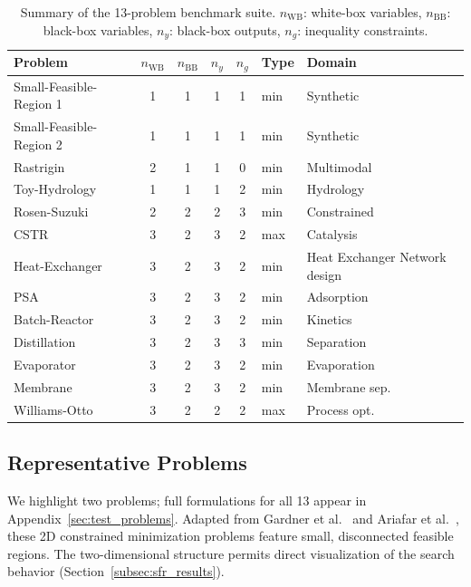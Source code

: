 \documentclass[12pt,a4paper]{article}%
\theoremstyle{plain}%
\theoremstyle{remark}%
\theoremstyle{definition}%
\def\WB{\mathrm{WB}}
\def\BB{\mathrm{BB}}
\begin{document}
\begin{table}[htbp]
\centering
\caption{Summary of the 13-problem benchmark suite. $n_{\WB}$: white-box variables, $n_{\BB}$: black-box variables, $n_y$: black-box outputs, $n_g$: inequality constraints.}
\label{tab:benchmark_summary}
\begin{tabular}{@{}lccccll@{}}
\toprule
\textbf{Problem} & $n_{\WB}$ & $n_{\BB}$ & $n_y$ & $n_g$ & \textbf{Type} & \textbf{Domain} \\
\midrule
Small-Feasible-Region 1 & 1 & 1 & 1 & 1 & min & Synthetic \\
Small-Feasible-Region 2 & 1 & 1 & 1 & 1 & min & Synthetic \\
Rastrigin & 2 & 1 & 1 & 0 & min & Multimodal \\
Toy-Hydrology & 1 & 1 & 1 & 2 & min & Hydrology \\
Rosen-Suzuki & 2 & 2 & 2 & 3 & min & Constrained \\
\midrule
CSTR & 3 & 2 & 3 & 2 & max & Catalysis \\
Heat-Exchanger & 3 & 2 & 3 & 2 & min & Heat Exchanger Network design \\
PSA & 3 & 2 & 3 & 2 & min & Adsorption \\
Batch-Reactor & 3 & 2 & 3 & 2 & min & Kinetics \\
Distillation & 3 & 2 & 3 & 3 & min & Separation \\
Evaporator & 3 & 2 & 3 & 2 & min & Evaporation \\
Membrane & 3 & 2 & 3 & 2 & min & Membrane sep.\ \\
Williams-Otto & 3 & 2 & 2 & 2 & max & Process opt.\ \\
\bottomrule
\end{tabular}
\end{table}



\subsection{Representative Problems}\label{subsec:representative_problems}

We highlight two problems; full formulations for all 13 appear in Appendix~\ref{sec:test_problems}.
Adapted from Gardner et al.~\cite{gardner2014} and Ariafar et al.~\cite{Ariafar2019}, these 2D constrained minimization problems feature small, disconnected feasible regions. The two-dimensional structure permits direct visualization of the search behavior (Section~\ref{subsec:sfr_results}).
\end{document}
